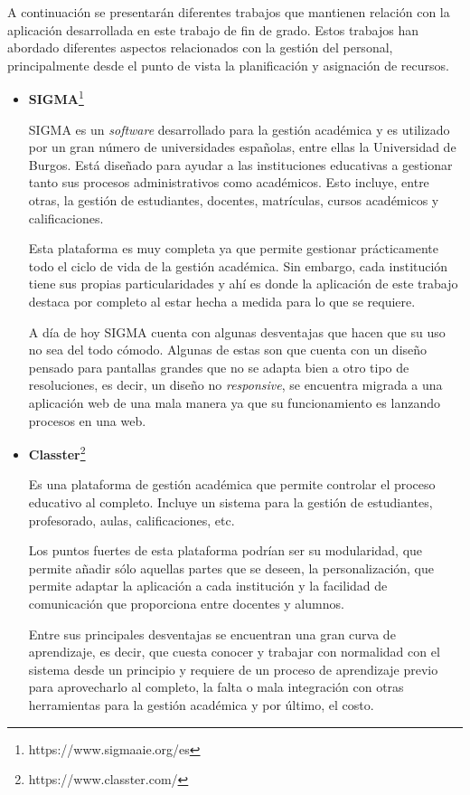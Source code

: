 
A continuación se presentarán diferentes trabajos que mantienen relación con la aplicación desarrollada en este trabajo de fin de grado.
Estos trabajos han abordado diferentes aspectos relacionados con la gestión del personal, principalmente desde el punto de vista la planificación y asignación de recursos.

\begin{itemize}
\item \textbf{SIGMA}\footnote{https://www.sigmaaie.org/es}

SIGMA es un \textit{software} desarrollado para la gestión académica y es utilizado por un gran número de universidades españolas, entre ellas la Universidad de Burgos.
Está diseñado para ayudar a las instituciones educativas a gestionar tanto sus procesos administrativos como académicos.
Esto incluye, entre otras, la gestión de estudiantes, docentes, matrículas, cursos académicos y calificaciones.

Esta plataforma es muy completa ya que permite gestionar prácticamente todo el ciclo de vida de la gestión académica. Sin embargo, cada institución tiene sus propias particularidades y ahí es donde la aplicación de este trabajo destaca por completo al estar hecha a medida para lo que se requiere.

A día de hoy SIGMA cuenta con algunas desventajas que hacen que su uso no sea del todo cómodo.
Algunas de estas son que cuenta con un diseño pensado para pantallas grandes que no se adapta bien a otro tipo de resoluciones, es decir, un diseño no \textit{responsive}, se encuentra migrada a una aplicación web de una mala manera ya que su funcionamiento es lanzando procesos en una web.

\item \textbf{Classter}\footnote{https://www.classter.com/}

Es una plataforma de gestión académica que permite controlar el proceso educativo al completo.
Incluye un sistema para la gestión de estudiantes, profesorado, aulas, calificaciones, etc.

Los puntos fuertes de esta plataforma podrían ser su modularidad, que permite añadir sólo aquellas partes que se deseen, la personalización, que permite adaptar la aplicación a cada institución y la facilidad de comunicación que proporciona entre docentes y alumnos.

Entre sus principales desventajas se encuentran una gran curva de aprendizaje, es decir, que cuesta conocer y trabajar con normalidad con el sistema desde un principio y requiere de un proceso de aprendizaje previo para aprovecharlo al completo, la falta o mala integración con otras herramientas para la gestión académica y por último, el costo.


\end{itemize}
